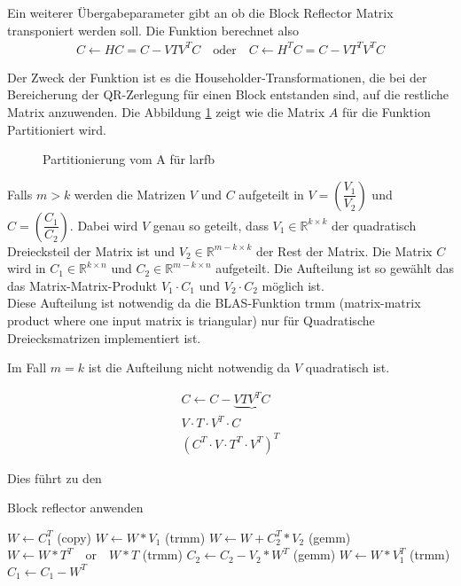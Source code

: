 Ein weiterer Übergabeparameter gibt an ob die Block Reflector Matrix transponiert werden soll.
Die Funktion berechnet also
\begin{align*}
	C \leftarrow H C = C - V T V^T C \quad \text{oder} \quad 	C \leftarrow H^T C = C - V T^T V^T C
\end{align*}

Der Zweck der Funktion ist es die Householder-Transformationen, die bei der Bereicherung der QR-Zerlegung für einen Block entstanden sind, auf die restliche Matrix anzuwenden.
Die Abbildung \ref{fig:patrA} zeigt wie die Matrix $A$ für die Funktion Partitioniert wird.
\begin{figure} [H]
	\centering
	
	\caption{Partitionierung vom A für larfb}
	\label{fig:patrA}
\end{figure}
Falls $m > k $ werden die Matrizen $V$ und $C$ aufgeteilt in $V=\left(\dfrac{V_1}{V_2}\right)$ und $C=\left(\dfrac{C_1}{C_2}\right)$.
Dabei wird $V$ genau so geteilt, dass $V_1 \in \mathbb{R}^{k\times k}$ der quadratisch Dreiecksteil der Matrix ist und $V_2 \in \mathbb{R}^{m-k\times k}$ der Rest der Matrix. Die Matrix $C$ wird in $C_1 \in \mathbb{R}^{k \times n}$ und $C_2 \in \mathbb{R}^{m-k \times n}$  aufgeteilt. Die Aufteilung ist so gewählt das das Matrix-Matrix-Produkt $V_1 \cdot C_1$ und $V_2 \cdot C_2$ möglich ist.\\
Diese Aufteilung ist notwendig da die BLAS-Funktion trmm (matrix-matrix product where one input matrix is triangular) nur für Quadratische Dreiecksmatrizen implementiert ist.

Im Fall $ m = k $ ist die Aufteilung nicht notwendig da $ V $ quadratisch ist.




\begin{align*}
	C \leftarrow  C - \underbrace{V T V^T C}\\
	V \cdot T \cdot V^T \cdot C\\ 
	(C^T \cdot V \cdot T^T \cdot V^T)^T 
\end{align*}



Dies führt zu den
\begin{algorithm}[H]
	\caption{Block reflector anwenden}
	\label{alg:applyblockref}
	\begin{algorithmic}
		\State 	$W \leftarrow C_1^T$ (copy)
		\State	$W \leftarrow W * V_1 $ (trmm)
			\State $W \leftarrow W + C_2^T*V_2$ (gemm)
		\EndIf
		\State 	$ W \leftarrow W * T^T \quad \text{or}\quad  W * T$ (trmm)
			\State $C_2 \leftarrow C_2 - V_2 * W^T$ (gemm)
		\EndIf
		\State 	$ W \leftarrow W * V_1^T $ (trmm)
		\State 	$ C_1 \leftarrow C_1 - W^T $
	\end{algorithmic}
\end{algorithm}





